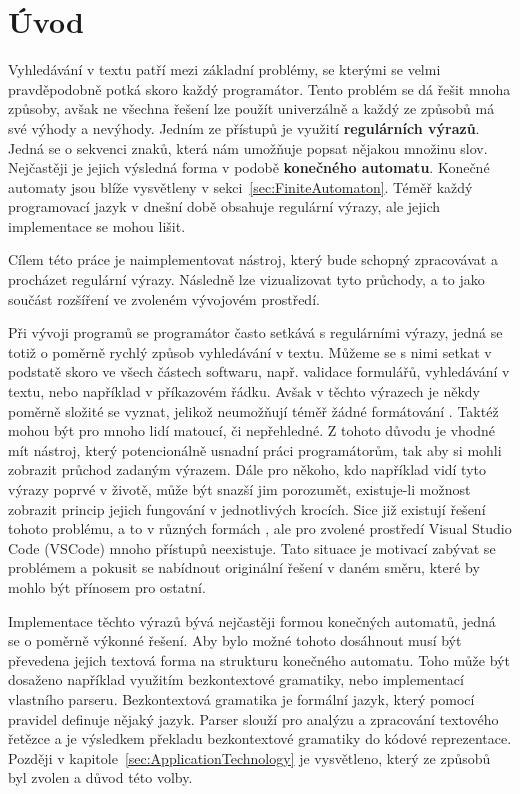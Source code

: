 \chapter{Úvod}\label{sec:Introduction}

Vyhledávání v textu patří mezi základní problémy, se kterými se velmi pravděpodobně potká skoro každý programátor. 
Tento problém se dá řešit mnoha způsoby, avšak ne všechna řešení lze použít univerzálně a každý ze způsobů má své výhody a nevýhody.
Jedním ze přístupů je využití \textbf{regulárních výrazů}. 
Jedná se o sekvenci znaků, která nám umožňuje popsat nějakou množinu slov.
Nejčastěji je jejich výsledná forma v podobě \textbf{konečného automatu}. 
Konečné automaty jsou blíže vysvětleny v sekci~\ref{sec:FiniteAutomaton}.
Téměř každý programovací jazyk v dnešní době obsahuje regulární výrazy, ale jejich implementace se mohou lišit.

Cílem této práce je naimplementovat nástroj, který bude schopný zpracovávat a procházet regulární výrazy. 
Následně lze vizualizovat tyto průchody, a to jako součást rozšíření ve zvoleném vývojovém prostředí.

Při vývoji programů se programátor často setkává s regulárními výrazy, jedná se totiž o poměrně rychlý způsob vyhledávání v textu. 
Můžeme se s nimi setkat v podstatě skoro ve všech částech softwaru, např. validace formulářů, vyhledávání v textu, nebo například v příkazovém řádku.
Avšak v těchto výrazech je někdy poměrně složité se vyznat, jelikož neumožňují téměř žádné formátování \cite{inproceedings}. 
Taktéž mohou být pro mnoho lidí matoucí, či nepřehledné.
Z tohoto důvodu je vhodné mít nástroj, který potencionálně usnadní práci programátorům, tak aby si mohli zobrazit průchod zadaným výrazem.
Dále pro někoho, kdo například vidí tyto výrazy poprvé v životě, může být snazší jim porozumět, existuje-li možnost zobrazit princip jejich fungování v jednotlivých krocích.
Sice již existují řešení tohoto problému, a to v různých formách \cite{Dib, Regexper, RegExr}, ale pro zvolené prostředí Visual Studio Code (VSCode) mnoho přístupů neexistuje.
Tato situace je motivací zabývat se problémem a pokusit se nabídnout originální řešení v daném směru, které by mohlo být přínosem pro ostatní.

Implementace těchto výrazů bývá nejčastěji formou konečných automatů, jedná se o poměrně výkonné řešení. 
Aby bylo možné tohoto dosáhnout musí být převedena jejich textová forma na strukturu konečného automatu.
Toho může být dosaženo například využitím bezkontextové gramatiky, nebo implementací vlastního parseru.
Bezkontextová gramatika je formální jazyk, který pomocí pravidel definuje nějaký jazyk.
Parser slouží pro analýzu a zpracování textového řetězce a je výsledkem překladu bezkontextové gramatiky do kódové reprezentace.
Později v kapitole~\ref{sec:ApplicationTechnology} je vysvětleno, který ze způsobů byl zvolen a důvod této volby.

